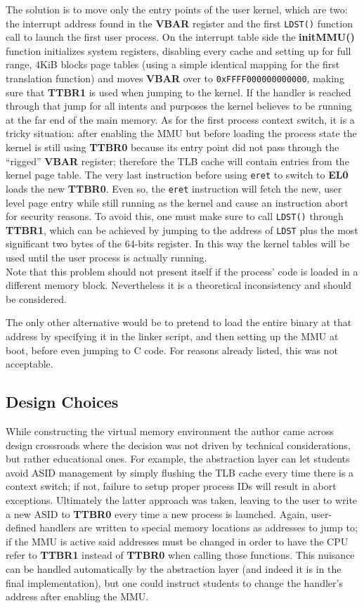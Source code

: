 \documentclass[12pt,a4paper,openright,twoside]{report}
\begin{document}
The solution is to move only the entry points of the user kernel, which are
two: the interrupt address found in the \textbf{VBAR} register and the first
{\tt LDST()} function call to launch the first user process. 
On the interrupt table side the \textbf{initMMU()} function
initializes system registers, disabling every cache and setting up for full
range, 4KiB blocks page tables (using a simple identical mapping for the first
translation function) and moves \textbf{VBAR} over to {\tt 0xFFFF000000000000},
making sure that \textbf{TTBR1} is used when jumping to the kernel. If the handler
is reached through that jump for all intents and purposes the kernel believes to 
be running at the far end of the main memory.
As for the first process context switch, it is a tricky situation: after enabling
the MMU but before loading the process state the kernel is still using \textbf{TTBR0}
because its entry point did not pass through the ``rigged'' \textbf{VBAR} register;
therefore the TLB cache will contain entries from the kernel page table.
The very last instruction before using {\tt eret} to switch to \textbf{EL0} loads
the new \textbf{TTBR0}. Even so, the {\tt eret} instruction will fetch the
new, user level page entry while still running as the kernel and
 cause an instruction abort for security reasons.
To avoid this, one must make sure to call {\tt LDST()} through \textbf{TTBR1},
which can be achieved by jumping to the address of {\tt LDST} plus the most significant
two bytes of the 64-bits register. In this way the kernel tables will be used 
until the user process is actually running.\\
Note that this problem should not present itself if the process' code is loaded
in a different memory block. Nevertheless it is a theoretical inconsistency and
should be considered.

The only other alternative would be to pretend to load the entire binary at that
address by specifying it in the linker script, and then setting up the MMU at 
boot, before even jumping to C code. For reasons already listed, this was not
acceptable.

\subsection{Design Choices}
While constructing the virtual memory environment the author came across design 
crossroads where the decision was not driven by technical considerations, but
rather educational ones.
For example, the abstraction layer can let students avoid ASID management by 
simply flushing the TLB cache every time there is a context switch; if not,
failure to setup proper process IDs will result in abort exceptions. Ultimately 
the latter approach was taken, leaving to the user to write a new ASID to 
\textbf{TTBR0} every time a new process is launched.
Again, user-defined handlers are written to special memory locations as addresses
to jump to; if the MMU is active said addresses must be changed in order to 
have the CPU refer to \textbf{TTBR1} instead of \textbf{TTBR0} when calling those
functions. This nuisance can be handled automatically by the abstraction layer
(and indeed it is in the final implementation), but one could instruct students
to change the handler's address after enabling the MMU.
\end{document}
